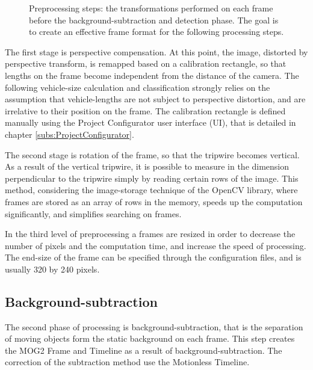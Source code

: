 \begin{figure}[!h]
	\centering
	
	\caption{Preprocessing steps: the transformations performed on each frame before the background-subtraction and detection phase. The goal is to create an effective frame format for the following processing steps.\label{fig:transforms}}
\end{figure}

The first stage is perspective compensation.
At this point, the image, distorted by perspective transform, is remapped based on a calibration rectangle, so that lengths on the frame become independent from the distance of the camera.
The following vehicle-size calculation and classification strongly relies on the assumption that vehicle-lengths are not subject to perspective distortion, and are irrelative to their position on the frame.
The calibration rectangle is defined manually using the Project Configurator user interface (UI), that is detailed in chapter \ref{subs:ProjectConfigurator}.

The second stage is rotation of the frame, so that the tripwire becomes vertical.
As a result of the vertical tripwire, it is possible to measure in the dimension perpendicular to the tripwire simply by reading certain rows of the image.
This method, considering the image-storage technique of the OpenCV library, where frames are stored as an array of rows in the memory, speeds up the computation significantly, and simplifies searching on frames.

In the third level of preprocessing a frames are resized in order to decrease the number of pixels and the computation time, and increase the speed of processing.
The end-size of the frame can be specified through the configuration files, and is usually 320 by 240 pixels.
\subsection{Background-subtraction}
The second phase of processing is background-subtraction, that is the separation of moving objects form the static background on each frame.
This step creates the MOG2 Frame and Timeline as a result of background-subtraction.
The correction of the subtraction method use the Motionless Timeline.

